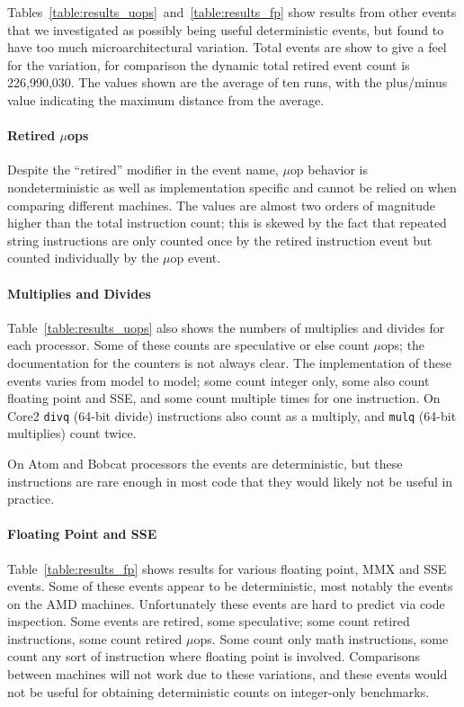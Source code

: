 Tables~\ref{table:results_uops}~and~\ref{table:results_fp} show results
from other events that we investigated as possibly being useful
deterministic events, but found to have too much microarchitectural
variation.  Total events are show to give a feel for the variation,
for comparison the dynamic total retired event count is
226,990,030.  The values shown are the average of ten runs, with
the plus/minus value indicating the maximum distance from the average.

\paragraph{Retired $\mu$ops}
Despite the ``retired'' modifier in the event name, 
$\mu$op behavior is nondeterministic as well as implementation
specific and cannot be relied on when comparing different machines.
The values are almost two orders of magnitude higher than the 
total instruction count; this is skewed by the fact that repeated
string instructions are only counted once by the retired instruction
event but counted individually by the $\mu$op event.

\paragraph{Multiplies and Divides}
Table~\ref{table:results_uops} also shows the numbers of 
multiplies and divides for each processor.  
Some of these counts are speculative or else count $\mu$ops; 
the documentation for the counters is not always clear.  
The implementation of these events varies from model to model;
some count integer only, some also count floating point and SSE, and some count
multiple times for one instruction.  
On Core2 {\tt divq} (64-bit divide) instructions also count as a multiply, 
and {\tt mulq} (64-bit multiplies) count twice.

On Atom and Bobcat processors the events are deterministic, but
these instructions are rare enough in most code that they
would likely not be useful in practice.

\paragraph{Floating Point and SSE}
Table~\ref{table:results_fp} shows results for various floating point,
MMX and SSE events.  Some of these events appear 
to be deterministic,
most notably the events on the AMD machines.  Unfortunately these events
are hard to predict via code inspection.  Some events are retired,
some speculative; some count retired instructions, some count retired
$\mu$ops.  Some count only math instructions, some count any sort
of instruction where floating point is involved.  Comparisons
between machines will not work due to these variations, and 
these events would not be useful for obtaining deterministic counts 
on integer-only benchmarks. 

